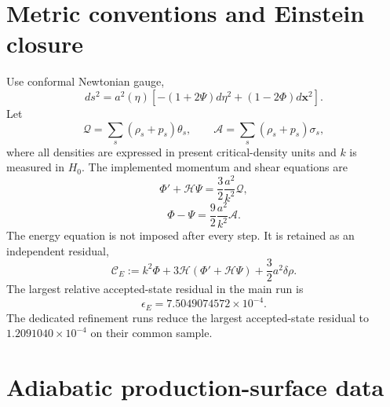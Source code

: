 \section{Metric conventions and Einstein closure}

Use conformal Newtonian gauge,
\begin{equation}
 ds^2=a^2(\eta)
 \left[-(1+2\Psi)d\eta^2+(1-2\Phi)d\mathbf x^2\right].
 \label{eq:pcmb-newtonian-gauge}
\end{equation}
Let
\begin{equation}
 \mathcal Q=\sum_s(\rho_s+p_s)\theta_s,
 \qquad
 \mathcal A=\sum_s(\rho_s+p_s)\sigma_s,
 \label{eq:pcmb-total-momentum-anis}
\end{equation}
where all densities are expressed in present critical-density units and $k$ is measured in $H_0$.  The implemented momentum and shear equations are
\begin{equation}
 \Phi'+\mathcal H\Psi
 =\frac{3}{2}\frac{a^2}{k^2}\mathcal Q,
 \label{eq:pcmb-einstein-momentum}
\end{equation}
\begin{equation}
 \Phi-\Psi
 =\frac{9}{2}\frac{a^2}{k^2}\mathcal A.
 \label{eq:pcmb-einstein-shear}
\end{equation}
The energy equation is not imposed after every step.  It is retained as an independent residual,
\begin{equation}
 \mathcal C_E
 :=k^2\Phi
 +3\mathcal H(\Phi'+\mathcal H\Psi)
 +\frac{3}{2}a^2\delta\rho.
 \label{eq:pcmb-energy-constraint}
\end{equation}
The largest relative accepted-state residual in the main run is
\begin{equation}
 \boxed{
 \epsilon_E=7.5049074572\times10^{-4}.}
 \label{eq:pcmb-energy-residual}
\end{equation}
The dedicated refinement runs reduce the largest accepted-state residual to $1.2091040\times10^{-4}$ on their common sample.

\section{Adiabatic production-surface data}

